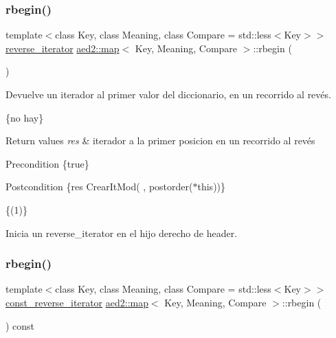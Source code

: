 \subsubsection{\texorpdfstring{rbegin()}{rbegin()}\hspace{0.1cm}{\footnotesize\ttfamily [1/2]}}
{\footnotesize\ttfamily template$<$class Key, class Meaning, class Compare = std\+::less$<$\+Key$>$$>$ \\
\hyperlink{classaed2_1_1map_a8e6a592062260177fd73b2f9897b1dd5}{reverse\+\_\+iterator} \hyperlink{classaed2_1_1map}{aed2\+::map}$<$ Key, Meaning, Compare $>$\+::rbegin (\begin{DoxyParamCaption}{ }\end{DoxyParamCaption})\hspace{0.3cm}{\ttfamily [inline]}}



Devuelve un iterador al primer valor del diccionario, en un recorrido al revés. 

\{no hay\}


\begin{DoxyRetVals}{Return values}
{\em res} & iterador a la primer posicion en un recorrido al revés\\
\hline
\end{DoxyRetVals}
\begin{DoxyPrecond}{Precondition}
\{true\} 
\end{DoxyPrecond}
\begin{DoxyPostcond}{Postcondition}
\{res  Crear\+It\+Mod(  , postorder($\ast$this))\}
\end{DoxyPostcond}
\{(1)\}

Inicia un reverse\+\_\+iterator en el hijo derecho de header. \mbox{\label{classaed2_1_1map_a71ab53ab04f5e35a189c6576fddeb483}} 
\subsubsection{\texorpdfstring{rbegin()}{rbegin()}\hspace{0.1cm}{\footnotesize\ttfamily [2/2]}}
{\footnotesize\ttfamily template$<$class Key, class Meaning, class Compare = std\+::less$<$\+Key$>$$>$ \\
\hyperlink{classaed2_1_1map_aed66a216549d13078a3ea6978ea0b768}{const\+\_\+reverse\+\_\+iterator} \hyperlink{classaed2_1_1map}{aed2\+::map}$<$ Key, Meaning, Compare $>$\+::rbegin (\begin{DoxyParamCaption}{ }\end{DoxyParamCaption}) const\hspace{0.3cm}{\ttfamily [inline]}}

